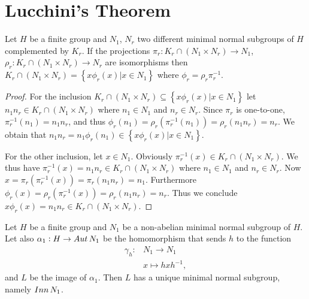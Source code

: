 \section{Lucchini's Theorem}

\begin{theorem}
    \label{phireq}
    Let $H$ be a finite group and $N_1$, $N_r$ two different minimal normal subgroups of $H$ complemented by $K_r$. If the projections $\pi_r : K_r \cap (N_1 \times N_r) \rightarrow N_1$, $\rho_r : K_r \cap (N_1 \times N_r) \rightarrow N_r$ are isomorphisms then $K_r \cap (N_1 \times N_r) = \left\{x\phi_r(x) | x \in N_1\right\}$ where $\phi_r = \rho_r\pi_r^{-1}$.
\end{theorem}

\begin{proof}
    For the inclusion $K_r \cap (N_1 \times N_r) \subseteq \left\{x\phi_r(x) | x \in N_1\right\}$ let $n_1n_r \in K_r \cap (N_1 \times N_r)$ where $n_1 \in N_1$ and $n_r \in N_r$.
    Since $\pi_r$ is one-to-one, $\pi^{-1}_r(n_1) = n_1n_r$, and thus $\phi_r(n_1) = \rho_r(\pi^{-1}_r(n_1)) = \rho_r(n_1n_r) = n_r$. We obtain that $n_1n_r = n_1\phi_r(n_1) \in \left\{x\phi_r(x) | x \in N_1\right\}$.

    For the other inclusion, let $x \in N_1$. Obviously 
    $\pi_r^{-1}(x) \in K_r \cap (N_1 \times N_r)$. 
    We thus have $\pi_r^{-1}(x) = n_1n_r \in K_r \cap (N_1 \times N_r)$  where $n_1 \in N_1$ and $n_r \in N_r$. 
    Now $x = \pi_r(\pi_r^{-1}(x)) = \pi_r(n_1n_r) = n_1$. 
    Furthermore $\phi_r(x) = \rho_r(\pi_r^{-1}(x)) = \rho_r(n_1n_r) = n_r$. Thus we conclude $x\phi_r(x) = n_1n_r \in K_r \cap (N_1 \times N_r)$.
\end{proof}

\begin{theorem}
    \label{imgaut}
    Let $H$ be a finite group and $N_1$ be a non-abelian minimal normal subgroup of $H$. Let also $\alpha_1: H \rightarrow Aut\, {N}_1$ be the homomorphism that sends $h$ to the function
    \begin{align*}
        \gamma_h \colon &N_1 \rightarrow N_1 \\
                        &x \mapsto hxh^{-1},
    \end{align*}
    and $L$ be the image of $\alpha_1$. 
    Then $L$ has a unique minimal normal subgroup, namely $Inn\, {N}_1$.
\end{theorem}

